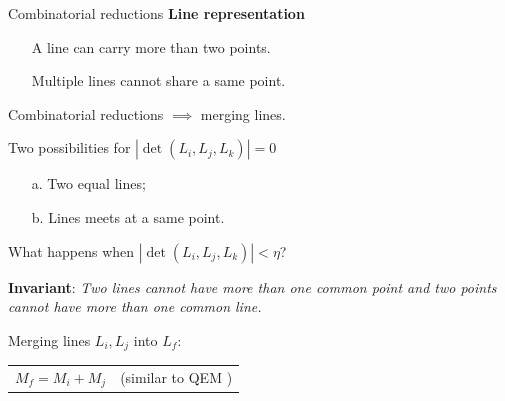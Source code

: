 \begin{frame}{Combinatorial reductions}
	\small
	\textbf{Line representation}
	\begin{itemize}
		\item[\cmark] A line can carry more than two points.
		\item[\xmark] Multiple lines cannot share a same point.
	\end{itemize}
	
	Combinatorial reductions $\implies$ merging lines.
	\pause
	
	\begin{minipage}{0.7\linewidth}	
		Two possibilities for $|\det(L_i, L_j, L_k) | = 0$
		
		\begin{enumerate}
			\item[a.] Two equal lines;
			\item[b.] Lines meets at a same point.
		\end{enumerate}
	
		What happens when $|\det(L_i, L_j, L_k) | < \eta$? 
	\end{minipage}%
	\begin{minipage}{0.3\linewidth}
	\end{minipage}
	
	\pause
	\textbf{Invariant}: {\em Two lines cannot have more than one common point and two points cannot have more than one common line.}
	
	Merging lines $L_i, L_j$ into $L_f$:
	
	\begin{tabular}{cc}
		$M_f = M_i + M_j$ & (similar to QEM \cite{garland_SurfaceSimplificationUsing_1997})
	\end{tabular}
\end{frame}

